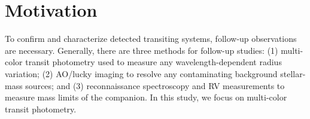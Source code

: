 \section{Motivation}\label{sec:followup}
To confirm and characterize detected transiting systems, follow-up observations are necessary. %
Generally, there are three methods for follow-up studies: (1) multi-color transit photometry used to measure any wavelength-dependent radius variation; (2) AO/lucky imaging to resolve any contaminating background stellar-mass sources; and (3) reconnaissance spectroscopy and RV measurements to measure mass limits of the companion. In this study, we focus on multi-color transit photometry. %


